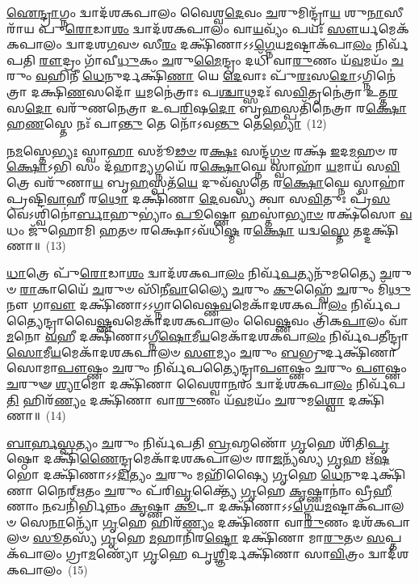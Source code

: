\-\ul{𑌐}\-\-\ul{𑌨𑍍𑌦𑍍𑌰𑌾}\-𑌗𑍍𑌨𑌂 𑌦𑍍𑌵𑌾𑌦᳴𑌶\-𑌕𑌪𑌾𑌲𑌂 𑌵𑍈𑌶𑍍𑌵\-\ul{𑌦𑍇}\-𑌵𑌂 \ul{𑌚}\-𑌰𑍁𑌮𑌿𑌨𑍍𑌦𑍍𑌰𑌾᳴\-\ul{𑌯} 𑌶𑍁\-\ul{𑌨𑌾}\-𑌸𑍀𑌰𑌾᳴𑌯 𑌪𑍁\-\ul{𑌰𑍋}\-𑌡𑌾\-\ul{𑌶𑌂} 𑌦𑍍𑌵𑌾𑌦᳴𑌶\-𑌕𑌪𑌾𑌲𑌂 𑌵𑌾\-\ul{𑌯}\-𑌵𑍍𑌯𑌂᳴ 𑌪𑌯𑌃᳴ \ul{𑌸𑍗}\-𑌰𑍍𑌯𑌮𑍇𑌕᳴𑌕𑌪𑌾𑌲𑌂 𑌦𑍍𑌵𑌾𑌦𑌶\-\ul{𑌗}\-𑌵𑍞 𑌸𑍀\-\ul{𑌰𑌂} 𑌦𑌕𑍍𑌷𑌿᳴𑌣𑌾\-𑌽\-𑌽\-\ul{𑌗𑍍𑌨𑍇}\-𑌯\-\ul{𑌮}\-𑌷𑍍𑌟𑌾\-𑌕᳴𑌪𑌾\-\ul{𑌲𑌂} 𑌨𑌿𑌰𑍍𑌵᳴𑌪𑌤𑌿 \ul{𑌰𑍗}\-𑌦𑍍𑌰𑌂 𑌗𑌾᳴𑌵𑍀\-\ul{𑌧𑍁}\-𑌕𑌂 \ul{𑌚}\-𑌰𑍁\-\ul{𑌮𑍈}\-𑌨𑍍𑌦𑍍𑌰𑌂 𑌦𑌧𑌿᳴ 𑌵𑌾\-\ul{𑌰𑍁}\-𑌣𑌂 𑌯᳴\-\ul{𑌵}\-𑌮𑌯𑌂᳴ \ul{𑌚}\-𑌰𑍁𑌂 \ul{𑌵}\-𑌹𑌿𑌨𑍀᳴ \ul{𑌧𑍇}\-𑌨𑍁𑌰𑍍𑌦𑌕𑍍𑌷𑌿᳴\-\ul{𑌣𑌾} 𑌯𑍇 \ul{𑌦𑍇}\-𑌵𑌾𑌃 𑌪𑍁᳴\-\ul{𑌰𑌃}\-𑌸\-\ul{𑌦𑍋}\-\-𑌽𑌗𑍍𑌨𑌿𑌨𑍇॑𑌤𑍍𑌰𑌾 𑌦𑌕𑍍𑌷𑌿\-\ul{𑌣}\-𑌸𑌦𑍋᳴ \ul{𑌯}\-𑌮𑌨𑍇॑𑌤𑍍𑌰𑌾𑌃 𑌪\-\ul{𑌶𑍍𑌚𑌾}\-𑌥𑍍𑌸𑌦𑌃᳴ 𑌸\-\ul{𑌵𑌿}\-𑌤𑍃𑌨𑍇॑𑌤𑍍𑌰𑌾 𑌉𑌤𑍍𑌤\-\ul{𑌰}\-𑌸\-\ul{𑌦𑍋} 𑌵𑌰𑍁᳴𑌣𑌨𑍇𑌤𑍍𑌰𑌾 𑌉𑌪\-\ul{𑌰𑌿}\-𑌷\-\ul{𑌦𑍋} 𑌬𑍃\-\ul{𑌹}\-𑌸𑍍𑌪𑌤𑌿᳴𑌨𑍇𑌤𑍍𑌰𑌾 𑌰\-\ul{𑌕𑍍𑌷𑍋}\-𑌹\-\ul{𑌣}\-𑌸𑍍𑌤𑍇 𑌨𑌃᳴ 𑌪𑌾\-\ul{𑌨𑍍𑌤𑍁} 𑌤𑍇 𑌨𑍋᳴\-𑌽𑌵\-\ul{𑌨𑍍𑌤𑍁} 𑌤𑍇\-\ul{𑌭𑍍𑌯𑍋}\-~(12)

𑌨\-\ul{𑌮}\-𑌸𑍍𑌤𑍇\-\ul{𑌭𑍍𑌯𑌃} 𑌸𑍍𑌵𑌾\-\ul{𑌹𑌾} 𑌸𑌮𑍂᳴\-\ul{𑌢}\-\-\ul{𑍞} 𑌰\-\ul{𑌕𑍍𑌷𑌃} 𑌸𑌨𑍍𑌦᳴\-\ul{𑌗𑍍𑌧}\-\-\ul{𑍞} 𑌰𑌕𑍍𑌷᳴ \ul{𑌇}\-𑌦\-\ul{𑌮}\-𑌹𑍞 𑌰\-\ul{𑌕𑍍𑌷𑍋}\-\-𑌽𑌭𑌿 𑌸𑌂 𑌦᳴𑌹𑌾\-\ul{𑌮𑍍𑌯}\-𑌗𑍍𑌨𑌯𑍇᳴ 𑌰\-\ul{𑌕𑍍𑌷𑍋}\-𑌘𑍍𑌨𑍇 𑌸𑍍𑌵𑌾𑌹𑌾᳴ \ul{𑌯}\-𑌮𑌾𑌯᳴ 𑌸\-\ul{𑌵𑌿}\-𑌤𑍍𑌰𑍇 𑌵𑌰𑍁᳴𑌣𑌾\-\ul{𑌯} 𑌬𑍃\-\ul{𑌹}\-𑌸𑍍𑌪𑌤᳴\-\ul{𑌯𑍇} 𑌦𑍁𑌵᳴𑌸𑍍𑌵𑌤𑍇 𑌰\-\ul{𑌕𑍍𑌷𑍋}\-𑌘𑍍𑌨𑍇 𑌸𑍍𑌵𑌾𑌹𑌾॑ 𑌪𑍍𑌰𑌷𑍍𑌟𑌿\-\ul{𑌵𑌾}\-𑌹𑍀 𑌰\-\ul{𑌥𑍋} 𑌦𑌕𑍍𑌷𑌿᳴𑌣𑌾 \ul{𑌦𑍇}\-𑌵𑌸𑍍𑌯᳴ 𑌤𑍍𑌵𑌾 𑌸\-\ul{𑌵𑌿}\-𑌤𑍁𑌃 𑌪𑍍𑌰᳴\-\ul{𑌸}\-𑌵𑍇॑\-𑌽𑌶𑍍𑌵𑌿𑌨𑍋॑\-\ul{𑌰𑍍𑌬𑌾}\-𑌹𑍁\-𑌭𑍍𑌯𑌾𑌂॑ \ul{𑌪𑍂}\-𑌷𑍍𑌣𑍋 𑌹𑌸𑍍𑌤𑌾॑\-\ul{𑌭𑍍𑌯𑌾}\-\-\ul{𑍞} 𑌰𑌕𑍍𑌷᳴𑌸𑍋 \ul{𑌵}\-𑌧𑌂 𑌜𑍁᳴𑌹𑍋𑌮𑌿 \ul{𑌹}\-𑌤𑍞 𑌰𑌕𑍍𑌷𑍋\-𑌽𑌵᳴𑌧𑌿\-\ul{𑌷𑍍𑌮} 𑌰\-\ul{𑌕𑍍𑌷𑍋} 𑌯𑌦𑍍𑌵\-\ul{𑌸𑍍𑌤𑍇} 𑌤𑌦𑍍𑌦𑌕𑍍𑌷𑌿᳴𑌣𑌾॥~(13)


{\anuvakamend[{𑌤𑍇\-\ul{𑌭𑍍𑌯𑌃} 𑌪𑌞𑍍𑌚᳴𑌚𑌤𑍍𑌵𑌾𑌰𑌿𑍞𑌶𑌚𑍍𑌚}]}%

\-\ul{𑌧𑌾}\-𑌤𑍍𑌰𑍇 𑌪𑍁᳴\-\ul{𑌰𑍋}\-𑌡𑌾\-\ul{𑌶𑌂} 𑌦𑍍𑌵𑌾𑌦᳴𑌶\-𑌕𑌪𑌾\-\ul{𑌲𑌂} 𑌨𑌿𑌰𑍍𑌵᳴\-\ul{𑌪}\-𑌤𑍍𑌯𑌨𑍁᳴𑌮𑌤𑍍𑌯𑍈 \ul{𑌚}\-𑌰𑍁𑍞 \ul{𑌰𑌾}\-𑌕𑌾𑌯𑍈᳴ \ul{𑌚}\-𑌰𑍁𑍞 𑌸𑌿᳴𑌨𑍀\-\ul{𑌵𑌾}\-𑌲𑍍𑌯𑍈 \ul{𑌚}\-𑌰𑍁𑌂 \ul{𑌕𑍁}\-𑌹𑍍𑌵𑍈᳴ \ul{𑌚}\-𑌰𑍁𑌂 𑌮𑌿᳴\-\ul{𑌥𑍁}\-𑌨𑍗 𑌗𑌾\-\ul{𑌵𑍗} 𑌦𑌕𑍍𑌷𑌿᳴𑌣𑌾\-𑌽\-𑌽𑌗𑍍𑌨𑌾𑌵𑍈𑌷𑍍𑌣\-\ul{𑌵}\-𑌮𑍇𑌕𑌾᳴\-𑌦𑌶\-𑌕𑌪𑌾\-\ul{𑌲𑌂} 𑌨𑌿𑌰𑍍𑌵᳴𑌪𑌤𑍍𑌯𑍈𑌨𑍍𑌦𑍍𑌰𑌾𑌵𑍈\-\ul{𑌷𑍍𑌣}\-𑌵𑌮𑍇𑌕𑌾᳴\-𑌦𑌶\-𑌕𑌪𑌾𑌲𑌂 𑌵𑍈\-\ul{𑌷𑍍𑌣}\-𑌵𑌂 𑌤𑍍𑌰𑌿᳴𑌕\-\ul{𑌪𑌾}\-𑌲𑌂 𑌵𑌾᳴\-\ul{𑌮}\-𑌨𑍋 \ul{𑌵}\-𑌹𑍀 𑌦𑌕𑍍𑌷𑌿᳴𑌣𑌾\-𑌽𑌗𑍍𑌨𑍀\-\ul{𑌷𑍋}\-𑌮𑍀\-\ul{𑌯}\-𑌮𑍇𑌕𑌾᳴\-𑌦𑌶\-𑌕𑌪𑌾\-\ul{𑌲𑌂} 𑌨𑌿𑌰𑍍𑌵᳴𑌪𑌤𑍀𑌨𑍍𑌦𑍍𑌰𑌾\-\-\ul{𑌸𑍋}\-𑌮𑍀\-\ul{𑌯}\-\-𑌮𑍇𑌕𑌾᳴\-𑌦𑌶\-𑌕𑌪𑌾𑌲𑍞 \ul{𑌸𑍗}\-𑌮𑍍𑌯𑌂 \ul{𑌚}\-𑌰𑍁𑌂 \ul{𑌬}\-𑌭𑍍𑌰𑍁𑌰𑍍𑌦𑌕𑍍𑌷𑌿᳴𑌣𑌾 𑌸𑍋𑌮𑌾\-\ul{𑌪𑍗}\-𑌷𑍍𑌣𑌂 \ul{𑌚}\-𑌰𑍁𑌂 𑌨𑌿𑌰𑍍𑌵᳴𑌪𑌤𑍍𑌯𑍈𑌨𑍍𑌦𑍍𑌰𑌾\-\ul{𑌪𑍗}\-𑌷𑍍𑌣𑌂 \ul{𑌚}\-𑌰𑍁𑌂 \ul{𑌪𑍗}\-𑌷𑍍𑌣𑌂 \ul{𑌚}\-𑌰𑍁𑍟 \ul{𑌶𑍍𑌯𑌾}\-𑌮𑍋 𑌦𑌕𑍍𑌷𑌿᳴𑌣𑌾 𑌵𑍈𑌶𑍍𑌵𑌾\-\ul{𑌨}\-𑌰𑌂 𑌦𑍍𑌵𑌾𑌦᳴𑌶\-𑌕𑌪𑌾\-\ul{𑌲𑌂} 𑌨𑌿𑌰𑍍𑌵᳴𑌪\-\ul{𑌤𑌿} 𑌹𑌿𑌰᳴\-\ul{𑌣𑍍𑌯𑌂} 𑌦𑌕𑍍𑌷𑌿᳴𑌣𑌾 𑌵𑌾\-\ul{𑌰𑍁}\-𑌣𑌂 𑌯᳴\-\ul{𑌵}\-𑌮𑌯𑌂᳴ \ul{𑌚}\-𑌰𑍁𑌮\-\ul{𑌶𑍍𑌵𑍋} 𑌦𑌕𑍍𑌷𑌿᳴𑌣𑌾॥~(14)

{\anuvakamend[{𑌨𑌿\-\ul{𑌰}\-𑌷𑍍𑌟𑍗 𑌚}]}%

\-\ul{𑌬𑌾}\-\-\ul{𑌰𑍍}\-\mbox{}\-\ul{𑌹}\-\-\ul{𑌸𑍍𑌪}\-𑌤𑍍𑌯𑌂 \ul{𑌚}\-𑌰𑍁𑌂 𑌨𑌿𑌰𑍍𑌵᳴𑌪𑌤𑌿 \ul{𑌬𑍍𑌰}\-𑌹𑍍𑌮𑌣𑍋᳴ \ul{𑌗𑍃}\-𑌹𑍇 𑌶𑌿᳴𑌤𑌿\-\ul{𑌪𑍃}\-𑌷𑍍𑌠𑍋 𑌦𑌕𑍍𑌷𑌿᳴\-\ul{𑌣𑍈}\-𑌨𑍍𑌦𑍍𑌰𑌮𑍇𑌕𑌾᳴\-𑌦𑌶\-𑌕𑌪𑌾𑌲𑍞 𑌰𑌾\-\ul{𑌜}\-𑌨𑍍𑌯᳴𑌸𑍍𑌯 \ul{𑌗𑍃}\-𑌹 𑌋᳴\-\ul{𑌷}\-𑌭𑍋 𑌦𑌕𑍍𑌷𑌿᳴𑌣𑌾\-𑌽\-𑌽\-\ul{𑌦𑌿}\-𑌤𑍍𑌯𑌂 \ul{𑌚}\-𑌰𑍁𑌂 𑌮𑌹𑌿᳴𑌷𑍍𑌯𑍈 \ul{𑌗𑍃}\-𑌹𑍇 \ul{𑌧𑍇}\-𑌨𑍁𑌰𑍍𑌦𑌕𑍍𑌷𑌿᳴𑌣𑌾 𑌨𑍈𑌰𑍍\mbox{}\-\ul{𑌋}\-𑌤𑌂 \ul{𑌚}\-𑌰𑍁𑌂 𑌪᳴𑌰𑌿\-\ul{𑌵𑍃}\-𑌕𑍍𑌤𑍍𑌯𑍈᳴ \ul{𑌗𑍃}\-𑌹𑍇 \ul{𑌕𑍃}\-𑌷𑍍𑌣𑌾𑌨𑌾𑌂॑ 𑌵𑍍𑌰𑍀\-\ul{𑌹𑍀}\-𑌣𑌾𑌂 \ul{𑌨}\-𑌖𑌨𑌿᳴𑌰𑍍𑌭𑌿𑌨𑍍𑌨𑌂 \ul{𑌕𑍃}\-𑌷𑍍𑌣𑌾 \ul{𑌕𑍂}\-𑌟𑌾 𑌦𑌕𑍍𑌷𑌿᳴𑌣𑌾\-𑌽\-𑌽\-\ul{𑌗𑍍𑌨𑍇}\-𑌯\-\ul{𑌮}\-𑌷𑍍𑌟𑌾𑌕᳴𑌪𑌾𑌲𑍞 𑌸𑍇\-\ul{𑌨𑌾}\-𑌨𑍍𑌯𑍋᳴ \ul{𑌗𑍃}\-𑌹𑍇 𑌹𑌿𑌰᳴\-\ul{𑌣𑍍𑌯𑌂} 𑌦𑌕𑍍𑌷𑌿᳴𑌣𑌾 𑌵𑌾\-\ul{𑌰𑍁}\-𑌣𑌂 𑌦𑌶᳴\-𑌕𑌪𑌾𑌲𑍞 \ul{𑌸𑍂}\-𑌤𑌸𑍍𑌯᳴ \ul{𑌗𑍃}\-𑌹𑍇 \ul{𑌮}\-𑌹𑌾𑌨𑌿᳴𑌰\-\ul{𑌷𑍍𑌟𑍋} 𑌦𑌕𑍍𑌷𑌿᳴𑌣𑌾 𑌮𑌾\-\ul{𑌰𑍁}\-𑌤𑍞 \ul{𑌸}\-𑌪𑍍𑌤𑌕᳴𑌪𑌾𑌲𑌂 𑌗𑍍𑌰𑌾\-\ul{𑌮}\-𑌣𑍍𑌯𑍋᳴ \ul{𑌗𑍃}\-𑌹𑍇 𑌪𑍃\-\ul{𑌶𑍍𑌞𑌿}\-𑌰𑍍𑌦𑌕𑍍𑌷𑌿᳴𑌣𑌾 𑌸𑌾\-\ul{𑌵𑌿}\-𑌤𑍍𑌰𑌂 𑌦𑍍𑌵𑌾𑌦᳴𑌶\-𑌕𑌪𑌾𑌲𑌂~(15)

